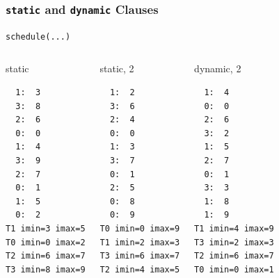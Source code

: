 \documentclass{beamer}
\begin{document}
\begin{frame}[fragile=singleslide]
  \frametitle{\texttt{static} and \texttt{dynamic} Clauses }

  \texttt{schedule(...)}

  \footnotesize

\begin{columns}[t]
  \column[T]{3cm}
  

  \begin{block}{static}
\begin{verbatim}
  1:  3
  3:  8
  2:  6
  0:  0
  1:  4
  3:  9
  2:  7
  0:  1
  1:  5
  0:  2
T1 imin=3 imax=5
T0 imin=0 imax=2
T2 imin=6 imax=7
T3 imin=8 imax=9
\end{verbatim}
  \end{block}

  \column[T]{3cm}
  \begin{block}{static, 2}
\begin{verbatim}
  1:  2
  3:  6
  2:  4
  0:  0
  1:  3
  3:  7
  0:  1
  2:  5
  0:  8
  0:  9
T0 imin=0 imax=9
T1 imin=2 imax=3
T3 imin=6 imax=7
T2 imin=4 imax=5
\end{verbatim}
  \end{block}  


  \column[T]{3cm}
  \begin{block}{dynamic, 2}
\begin{verbatim} 
  1:  4
  0:  0
  2:  6
  3:  2
  1:  5
  2:  7
  0:  1
  3:  3
  1:  8
  1:  9
T1 imin=4 imax=9
T3 imin=2 imax=3
T2 imin=6 imax=7
T0 imin=0 imax=1
\end{verbatim}
  \end{block}  

\end{columns}
\end{frame}
\end{document}
